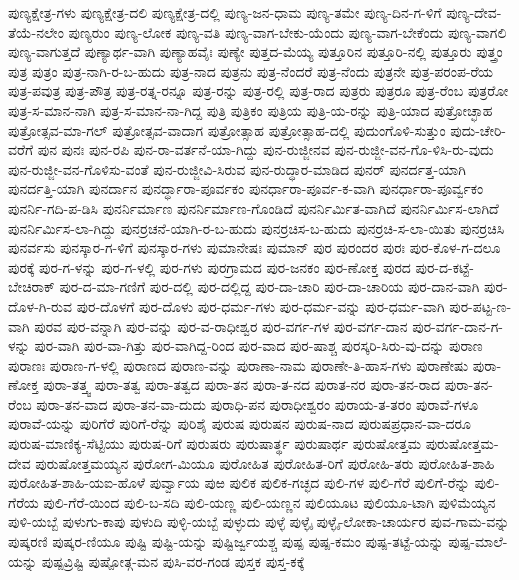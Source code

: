 ಪುಣ್ಯಕ್ಷೇತ್ರ-ಗಳು
ಪುಣ್ಯಕ್ಷೇತ್ರ-ದಲಿ
ಪುಣ್ಯಕ್ಷೇತ್ರ-ದಲ್ಲಿ
ಪುಣ್ಯ-ಜನ-ಧಾಮ
ಪುಣ್ಯ-ತಮೇ
ಪುಣ್ಯ-ದಿನ-ಗ-ಳಿಗೆ
ಪುಣ್ಯ-ದೇವ-ತೆಯೆ-ನಲೇಂ
ಪುಣ್ಯರುಂ
ಪುಣ್ಯ-ಲೋಕ
ಪುಣ್ಯ-ವತಿ
ಪುಣ್ಯ-ವಾಗ-ಬೇಕು-ಯೆಂದು
ಪುಣ್ಯ-ವಾಗ-ಬೇಕೆಂದು
ಪುಣ್ಯ-ವಾಗಲಿ
ಪುಣ್ಯ-ವಾಗುತ್ತದೆ
ಪುಣ್ಯಾರ್ಥ-ವಾಗಿ
ಪುಣ್ಯಾಹವೈಃ
ಪುಣ್ಯೇ
ಪುತ್ತದ-ಮೆಯ್ಯ
ಪುತ್ತೂರಿನ
ಪುತ್ತೂರಿ-ನಲ್ಲಿ
ಪುತ್ತೂರು
ಪುತ್ತ್ರಂ
ಪುತ್ರ
ಪುತ್ರಂ
ಪುತ್ರ-ನಾಗಿ-ರ-ಬ-ಹುದು
ಪುತ್ರ-ನಾದ
ಪುತ್ರನು
ಪುತ್ರ-ನೆಂದರೆ
ಪುತ್ರ-ನೆಂದು
ಪುತ್ರನೇ
ಪುತ್ರ-ಪರಂಪ-ರೆಯ
ಪುತ್ರ-ಪವುತ್ರ
ಪುತ್ರ-ಪೌತ್ರ
ಪುತ್ರ-ರತ್ನ-ರನ್ನೂ
ಪುತ್ರ-ರನ್ನು
ಪುತ್ರ-ರಲ್ಲಿ
ಪುತ್ರ-ರಾದ
ಪುತ್ರರು
ಪುತ್ರರೂ
ಪುತ್ರ-ರೆಂಬ
ಪುತ್ರರೋ
ಪುತ್ರ-ಸ-ಮಾನ-ನಾಗಿ
ಪುತ್ರ-ಸ-ಮಾನ-ನಾ-ಗಿದ್ದ
ಪುತ್ರಿ
ಪುತ್ರಿಕಂ
ಪುತ್ರಿಯ
ಪುತ್ರಿ-ಯ-ರನ್ನು
ಪುತ್ರಿ-ಯಾದ
ಪುತ್ರೋಚ್ಛಾಹ
ಪುತ್ರೋತ್ಸವ-ಮಾ-ಗಲ್
ಪುತ್ರೋತ್ಸವ-ವಾದಾಗ
ಪುತ್ರೋತ್ಸಾಹ
ಪುತ್ರೋತ್ಸಾಹ-ದಲ್ಲಿ
ಪುದುಂಗೊಳಿ-ಸುತ್ತುಂ
ಪುದು-ಚೇರಿ-ವರೆಗೆ
ಪುನ
ಪುನಃ
ಪುನ-ರಪಿ
ಪುನ-ರಾ-ವರ್ತನೆ-ಯಾ-ಗಿದ್ದು
ಪುನ-ರುಜ್ಜೀನವ
ಪುನ-ರುಜ್ಜೀ-ವನ-ಗೊ-ಳಿಸಿ-ರು-ವುದು
ಪುನ-ರುಜ್ಜೀ-ವನ-ಗೊಳಿಸು-ವಂತೆ
ಪುನ-ರುಜ್ಜೀವಿ-ಸಿರುವ
ಪುನ-ರುದ್ಧಾರ-ಮಾಡಿದ
ಪುನರ್
ಪುನರ್ದತ್ತ-ಯಾಗಿ
ಪುನರ್ದತ್ತಿ-ಯಾಗಿ
ಪುನರ್ದಾನ
ಪುನರ್ದ್ಧಾರಾ-ಪೂರ್ವಕಂ
ಪುನರ್ಧಾರಾ-ಪೂರ್ವ-ಕ-ವಾಗಿ
ಪುನರ್ಧಾರಾ-ಪೂರ್ವ್ವಕಂ
ಪುನರ್ನಿ-ಗದಿ-ಪ-ಡಿಸಿ
ಪುನರ್ನಿರ್ಮಾಣ
ಪುನರ್ನಿರ್ಮಾಣ-ಗೊಂಡಿದೆ
ಪುನರ್ನಿರ್ಮಿತ-ವಾಗಿದೆ
ಪುನರ್ನಿರ್ಮಿಸ-ಲಾಗಿದೆ
ಪುನರ್ನಿರ್ಮಿಸ-ಲಾ-ಗಿದ್ದು
ಪುನರ್ರಚನೆ-ಯಾಗಿ-ರ-ಬ-ಹುದು
ಪುನರ್ರಚಿಸ-ಬ-ಹುದು
ಪುನರ್ರಚಿ-ಸ-ಲಾ-ಯಿತು
ಪುನರ್ರಚಿಸಿ
ಪುನರ್ವಸು
ಪುನಸ್ಕಾರ-ಗ-ಳಿಗೆ
ಪುನಸ್ಕಾರ-ಗಳು
ಪುಮಾನೇಷಃ
ಪುಮಾನ್
ಪುರ
ಪುರಂದರ
ಪುರಃ
ಪುರ-ಕೊಳ-ಗ-ದಲೂ
ಪುರಕ್ಕೆ
ಪುರ-ಗ-ಳನ್ನು
ಪುರ-ಗ-ಳಲ್ಲಿ
ಪುರ-ಗಳು
ಪುರಗ್ರಾಮದ
ಪುರ-ಜನಕಂ
ಪುರ-ಣೋಕ್ತ
ಪುರದ
ಪುರ-ದ-ಕಟ್ಟೆ-ಬೇಚಿರಾಕ್
ಪುರ-ದ-ಮಾ-ಗಣಿಗೆ
ಪುರ-ದಲ್ಲಿ
ಪುರ-ದಲ್ಲಿದ್ದ
ಪುರ-ದಾ-ಚಾರಿ
ಪುರ-ದಾ-ಚಾರಿಯ
ಪುರ-ದಾನ-ವಾಗಿ
ಪುರ-ದೊಳ-ಗಿ-ರುವ
ಪುರ-ದೊಳಗೆ
ಪುರ-ದೊಳು
ಪುರ-ಧರ್ಮ-ಗಳು
ಪುರ-ಧರ್ಮ-ವನ್ನು
ಪುರ-ಧರ್ಮ-ವಾಗಿ
ಪುರ-ಪಟ್ಟ-ಣ-ವಾಗಿ
ಪುರವ
ಪುರ-ವನ್ನಾಗಿ
ಪುರ-ವನ್ನು
ಪುರ-ವ-ರಾಧೀಶ್ವರ
ಪುರ-ವರ್ಗ-ಗಳ
ಪುರ-ವರ್ಗ-ದಾನ
ಪುರ-ವರ್ಗ-ದಾನ-ಗ-ಳನ್ನು
ಪುರ-ವಾಗಿ
ಪುರ-ವಾ-ಗಿತ್ತು
ಪುರ-ವಾಗಿದ್ದ-ರಿಂದ
ಪುರ-ವಾದ
ಪುರ-ಷಾಶ್ಚ
ಪುರಸ್ಕರಿ-ಸಿರು-ವು-ದನ್ನು
ಪುರಾಣ
ಪುರಾಣಃ
ಪುರಾಣ-ಗ-ಳಲ್ಲಿ
ಪುರಾಣದ
ಪುರಾಣ-ವನ್ನು
ಪುರಾಣಾ-ನಾಮ
ಪುರಾಣೇ-ತಿ-ಹಾಸ-ಗಳು
ಪುರಾಣೇಷು
ಪುರಾ-ಣೋಕ್ತ
ಪುರಾ-ತತ್ತ್ವ
ಪುರಾ-ತತ್ವ
ಪುರಾ-ತತ್ವದ
ಪುರಾ-ತನ
ಪುರಾ-ತ-ನದ
ಪುರಾತ-ನರ
ಪುರಾ-ತನ-ರಾದ
ಪುರಾ-ತನ-ರೆಂಬ
ಪುರಾ-ತನ-ವಾದ
ಪುರಾ-ತನ-ವಾ-ದುದು
ಪುರಾಧಿ-ಪನ
ಪುರಾಧೀಶ್ವರಂ
ಪುರಾಯ-ತ-ತರಂ
ಪುರಾವೆ-ಗಳೂ
ಪುರಾವೆ-ಯನ್ನು
ಪುರಿಗೆರೆ
ಪುರಿಗೆ-ರೆನ್ನು
ಪುರಿಶೈ
ಪುರುಷ
ಪುರುಷನ
ಪುರುಷ-ನಾದ
ಪುರುಷಪ್ರಧಾನ-ವಾ-ದರೂ
ಪುರುಷ-ಮಾಣಿಕ್ಯ-ಸೆಟ್ಟಿಯು
ಪುರುಷ-ರಿಗೆ
ಪುರುಷರು
ಪುರುಷಾರ್ತ್ಥ
ಪುರುಷಾರ್ಥ
ಪುರುಷೋತ್ತಮ
ಪುರುಷೋತ್ತಮ-ದೇವ
ಪುರುಷೋತ್ತಮಯ್ಯನ
ಪುರೋಗ-ಮಿಯೂ
ಪುರೋಹಿತ
ಪುರೋಹಿತ-ರಿಗೆ
ಪುರೋಹಿ-ತರು
ಪುರೋಹಿತ-ಶಾಹಿ
ಪುರೋಹಿತ-ಶಾಹಿ-ಯಐ-ಹೊಳೆ
ಪುರ್ವ್ವಾಯ
ಪುಱ
ಪುಲಿಕ
ಪುಲಿಕ-ಗಚ್ಛದ
ಪುಲಿ-ಗಳ
ಪುಲಿ-ಗೆರೆ
ಪುಲಿಗೆ-ರೆನ್ನು
ಪುಲಿ-ಗೆರೆಯ
ಪುಲಿ-ಗೆರೆ-ಯಿಂದ
ಪುಲಿ-ಬ-ಸದಿ
ಪುಲಿ-ಯಣ್ಣ
ಪುಲಿ-ಯಣ್ಣನ
ಪುಲಿಯೂಟ
ಪುಲಿಯೂ-ಟಾಗಿ
ಪುಳಿಮೆಯ್ಯನ
ಪುಳಿ-ಯಬ್ಬೆ
ಪುಳುಗು-ಕಾಪು
ಪುಳುದಿ
ಪುಳ್ಳಿ-ಯಬ್ಬೆ
ಪುಳ್ಳುದು
ಪುಳ್ಳೆ
ಪುಳ್ಳೈ
ಪುಳ್ಳೈ-ಲೋಕಾ-ಚಾರ್ಯರ
ಪುವ-ಗಾಮ-ವನ್ನು
ಪುಷ್ಕರಣಿ
ಪುಷ್ಕರ-ಣಿಯೂ
ಪುಷ್ಟಿ
ಪುಷ್ಟಿ-ಯನ್ನು
ಪುಷ್ಟಿರ್ಜ್ವಯಶ್ಚ
ಪುಷ್ಪ
ಪುಷ್ಪ-ಕಮಂ
ಪುಷ್ಪ-ತಟ್ಟೆ-ಯನ್ನು
ಪುಷ್ಪ-ಮಾಲೆ-ಯನ್ನು
ಪುಷ್ಪವ್ರಿಷ್ಟಿ
ಪುಷ್ಪೋತ್ಗ-ಮನ
ಪುಸಿ-ವರ-ಗಂಡ
ಪುಸ್ತಕ
ಪುಸ್ತ-ಕಕ್ಕೆ
